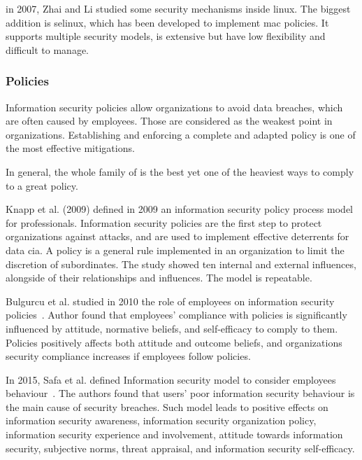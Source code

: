 in 2007, Zhai and Li \cite{zhai_analysis_2008} studied some security mechanisms inside \gls{linux}. The biggest addition is \gls{selinux}, which has been developed to implement \gls{mac} policies. It supports multiple security models, is extensive but have low flexibility and difficult to manage. %

\subsubsection{Policies}
\label{subsubsec:state_review_results_policies}

Information security policies allow organizations to avoid data breaches, which are often caused by employees. Those are considered as the weakest point in organizations. Establishing and enforcing a complete and adapted policy is one of the most effective mitigations.

In general, the whole family of  is the best yet one of the heaviest ways to comply to a great policy. 

Knapp et al. \cite{knapp_information_2009} (2009) defined in 2009 an information security policy process model for professionals. Information security policies are the first step to protect organizations against attacks, and are used to implement effective deterrents for data \gls{cia}. A policy is a general rule implemented in an organization to limit the discretion of subordinates. The study showed ten internal and external influences, alongside of their relationships and influences. The model is repeatable. %

Bulgurcu et al. studied in 2010 the role of employees on information security policies~\cite{bulgurcu_information_2010}. Author found that employees' compliance with policies is significantly influenced by attitude, normative beliefs, and self-efficacy to comply to them. Policies positively affects both attitude and outcome beliefs, and organizations security compliance increases if employees follow policies. %

In 2015, Safa et al. defined Information security model to consider employees behaviour~\cite{safa_information_2015}. The authors found that users' poor information security behaviour is the main cause of security breaches. Such model leads to positive effects on information security awareness, information security organization policy, information security experience and involvement, attitude towards information security, subjective norms, threat appraisal, and information security self-efficacy. %


